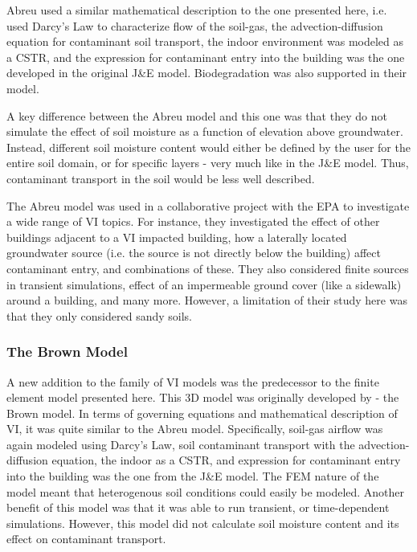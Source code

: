 Abreu used a similar mathematical description to the one presented here, i.e. used Darcy's Law to characterize flow of the soil-gas, the advection-diffusion equation for contaminant soil transport, the indoor environment was modeled as a CSTR, and the expression for contaminant entry into the building was the one developed in the original J\&E model.
Biodegradation was also supported in their model.\par

A key difference between the Abreu model and this one was that they do not simulate the effect of soil moisture as a function of elevation above groundwater.
Instead, different soil moisture content would either be defined by the user for the entire soil domain, or for specific layers - very much like in the J\&E model.
Thus, contaminant transport in the soil would be less well described.\par

The Abreu model was used in a collaborative project with the EPA to investigate a wide range of VI topics.
For instance, they investigated the effect of other buildings adjacent to a VI impacted building, how a laterally located groundwater source (i.e. the source is not directly below the building) affect contaminant entry, and combinations of these.
They also considered finite sources in transient simulations, effect of an impermeable ground cover (like a sidewalk) around a building, and many more.
However, a limitation of their study here was that they only considered sandy soils.\par

\subsubsection{The Brown Model}

A new addition to the family of VI models was the predecessor to the finite element model presented here.
This 3D model was originally developed by \citeauthor{pennell_development_2009}\cite{pennell_development_2009} - the Brown model.
In terms of governing equations and mathematical description of VI, it was quite similar to the Abreu model.
Specifically, soil-gas airflow was again modeled using Darcy's Law, soil contaminant transport with the advection-diffusion equation, the indoor as a CSTR, and expression for contaminant entry into the building was the one from the J\&E model.
The FEM nature of the model meant that heterogenous soil conditions could easily be modeled.
Another benefit of this model was that it was able to run transient, or time-dependent simulations.
However, this model did not calculate soil moisture content and its effect on contaminant transport.\par

